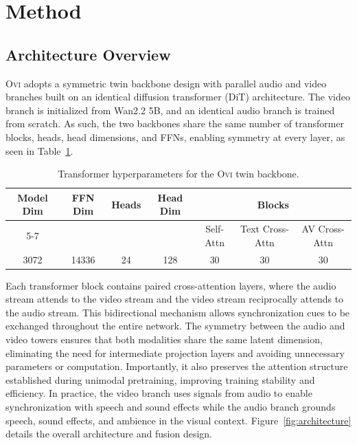 \documentclass{article} %
\begin{document}
\section{Method}

\subsection{Architecture Overview}
\label{subsec:architecture-overview}
\textsc{Ovi} adopts a symmetric twin backbone design with parallel audio and video branches built on an identical diffusion transformer (DiT) architecture. The video branch is initialized from Wan2.2 5B, and an identical audio branch is trained from scratch. As such, the two backbones share the same number of transformer blocks, heads, head dimensions, and FFNs, enabling symmetry at every layer, as seen in Table~\ref{tab:ovi_transformer_config}.

\begin{table}[h]
  \centering
  \caption{Transformer hyperparameters for the \textsc{Ovi} twin backbone.}
  \label{tab:ovi_transformer_config}
  \begin{tabular}{ccccccc} %
    \toprule
    Model Dim & FFN Dim & Heads & Head Dim & \multicolumn{3}{c}{Blocks} \\
    \cmidrule(lr){5-7}
              &         &       &          & Self-Attn & Text Cross-Attn & AV Cross-Attn \\
    \midrule
    3072      & 14336   & 24    & 128      & 30        & 30              & 30 \\
    \bottomrule
  \end{tabular}
\end{table}

Each transformer block contains paired cross-attention layers, where the audio stream attends to the video stream and the video stream reciprocally attends to the audio stream. This bidirectional mechanism allows synchronization cues to be exchanged throughout the entire network. The symmetry between the audio and video towers ensures that both modalities share the same latent dimension, eliminating the need for intermediate projection layers and avoiding unnecessary parameters or computation. Importantly, it also preserves the attention structure established during unimodal pretraining, improving training stability and efficiency. In practice, the video branch uses signals from audio to enable synchronization with speech and sound effects while the audio branch grounds speech, sound effects, and ambience in the visual context. Figure~\ref{fig:architecture} details the overall architecture and fusion design. 
\end{document}
